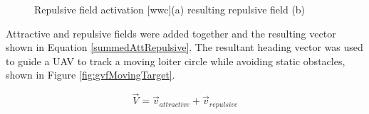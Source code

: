 \documentclass[numbered,pdftex]{ohio-etd}
\begin{document}
\begin{figure}[H]
	\begin{subfigmatrix}{2}%
		\centering	
		\hspace*{0mm}
	\end{subfigmatrix}
	\caption{Repulsive field activation [wwc](a) resulting repulsive field (b)}
	\label{fig:tanhICUAS2018}
\end{figure}


Attractive and repulsive fields were added together and the resulting vector shown in Equation \ref{summedAttRepulsive}. The resultant heading vector was used to guide a UAV to track a moving loiter circle while avoiding static obstacles, shown in Figure \ref{fig:gvfMovingTarget}.

\begin{equation}
\vec{V} = \vec{v}_{attractive}+\vec{v}_{repulsive}
\label{summedAttRepulsive}
\end{equation}
\end{document}
